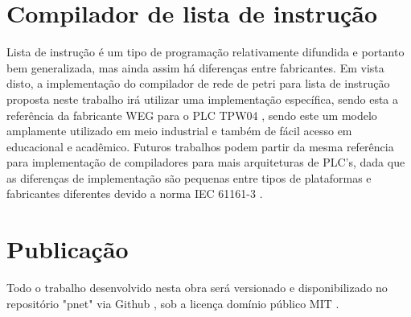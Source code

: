 \section{Compilador de lista de instrução}

Lista de instrução é um tipo de programação relativamente difundida e portanto bem generalizada, mas ainda assim há diferenças entre fabricantes. Em vista disto, a implementação do compilador de rede de petri para lista de instrução proposta neste trabalho irá utilizar uma implementação específica, sendo esta a referência da fabricante WEG para o PLC TPW04 \cite{wegtpw04}, sendo este um modelo amplamente utilizado em meio industrial e também de fácil acesso em educacional e acadêmico. Futuros trabalhos podem partir da mesma referência para implementação de compiladores para mais arquiteturas de PLC's, dada que as diferenças de implementação são pequenas entre tipos de plataformas e fabricantes diferentes devido a norma IEC 61161-3 \cite{IEC611313}.  

\section{Publicação}

Todo o trabalho desenvolvido nesta obra será versionado e disponibilizado no repositório "pnet" \cite{github-pnet} via Github \cite{github}, sob a licença domínio público MIT \cite{mit-license}.

